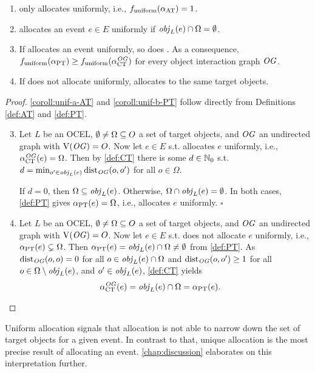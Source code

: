 \begin{corollary}
  \phantom{Wer das liest ist blöd <3}

  \nopagebreak
  \begin{enumerate}[label={(\alph*)}]
    \item {} only allocates uniformly, i.e., $f_{\text{uniform}}(\alpha_\text{AT}) = 1$.
    \label{coroll:unif-a-AT}
    \item {} allocates an event $e\in E$ uniformly if $\mathit{obj}_L(e)\cap\Omega=\emptyset$.
    \label{coroll:unif-b-PT}
    \item If  allocates an event uniformly, so does . As a consequence, $f_{\text{uniform}}(\alpha_\text{PT}) \geq f_{\text{uniform}}(\alpha^{\mathit{OG}}_\text{CT})$ for every object interaction graph $\mathit{OG}$.
    \label{coroll:unif-c-CT-PT}
    \item If  does not allocate uniformly,  allocates to the same target objects.
    \label{coroll:unif-d-PT-CT-eq}
  \end{enumerate}
  \label{coroll:unif}
\end{corollary}

\begin{proof}
  \ref{coroll:unif-a-AT} and \ref{coroll:unif-b-PT} follow directly from Definitions \ref{def:AT} and \ref{def:PT}.
  \begin{enumerate}[label={(\alph*)}]
    \setcounter{enumi}{2}
    \item Let $L$ be an OCEL, $\emptyset\neq\Omega\subseteq O$ a set of target objects, and $\mathit{OG}$ an undirected graph with $\operatorname{V}(\mathit{OG})=O$. Now let $e\in E$ s.t.  allocates $e$ uniformly, i.e., $\alpha^{\mathit{OG}}_\text{CT}(e)=\Omega$. Then by \cref{def:CT} there is some $d\in\mathbb{N}_0$ s.t. $d=\min_{o'\in\mathit{obj}_L(e)} \operatorname{dist}_{\mathit{OG}}(o,o')$ for all $o\in\Omega$.

    If $d=0$, then $\Omega\subseteq\mathit{obj}_L(e)$.
    Otherwise, $\Omega\cap\mathit{obj}_L(e)=\emptyset$.
    In both cases, \cref{def:PT} gives $\alpha_\text{PT}(e)=\Omega$, i.e.,  allocates $e$ uniformly. \hfill$\square$
    \item Let $L$ be an OCEL, $\emptyset\neq\Omega\subseteq O$ a set of target objects, and $\mathit{OG}$ an undirected graph with $\operatorname{V}(\mathit{OG})=O$. Now let $e\in E$ s.t.  does not allocate $e$ uniformly, i.e., $\alpha_\text{PT}(e) \subsetneq\Omega$. Then $\alpha_\text{PT}(e)=\mathit{obj}_L(e)\cap\Omega\neq\emptyset$ from \cref{def:PT}.
    As $\operatorname{dist}_{\mathit{OG}}(o,o)=0$ for all $o\in\mathit{obj}_L(e)\cap\Omega$ and $\operatorname{dist}_{\mathit{OG}}(o,o')\geq 1$ for all $o\in\Omega\setminus\mathit{obj}_L(e)$, and $o'\in\mathit{obj}_L(e)$, \cref{def:CT} yields
    \begin{align*}
      \alpha^{\mathit{OG}}_\text{CT}(e) &= \mathit{obj}_L(e)\cap\Omega = \alpha_\text{PT}(e). \qedhere
    \end{align*}
  \end{enumerate}
\end{proof}

Uniform allocation signals that allocation is not able to narrow down the set of target objects for a given event.
In contrast to that, unique allocation is the most precise result of allocating an event.
\autoref{chap:discussion} elaborates on this interpretation further.

